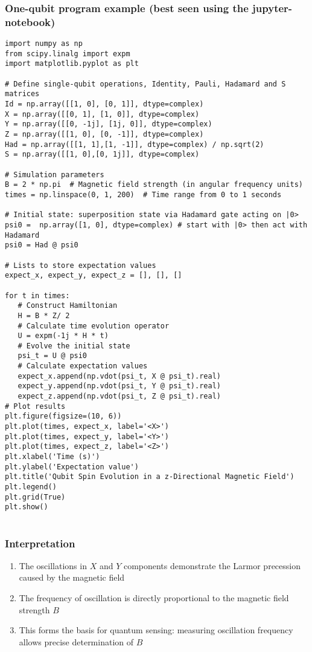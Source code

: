 \documentclass{beamer}
\begin{document}
\begin{frame}
\frametitle{One-qubit program example (best seen using the jupyter-notebook)}

\begin{verbatim}
import numpy as np
from scipy.linalg import expm
import matplotlib.pyplot as plt

# Define single-qubit operations, Identity, Pauli, Hadamard and S matrices
Id = np.array([[1, 0], [0, 1]], dtype=complex)
X = np.array([[0, 1], [1, 0]], dtype=complex)
Y = np.array([[0, -1j], [1j, 0]], dtype=complex)
Z = np.array([[1, 0], [0, -1]], dtype=complex)
Had = np.array([[1, 1],[1, -1]], dtype=complex) / np.sqrt(2)
S = np.array([[1, 0],[0, 1j]], dtype=complex)

# Simulation parameters
B = 2 * np.pi  # Magnetic field strength (in angular frequency units)
times = np.linspace(0, 1, 200)  # Time range from 0 to 1 seconds

# Initial state: superposition state via Hadamard gate acting on |0>
psi0 =  np.array([1, 0], dtype=complex) # start with |0> then act with Hadamard
psi0 = Had @ psi0

# Lists to store expectation values
expect_x, expect_y, expect_z = [], [], []

for t in times:
   # Construct Hamiltonian
   H = B * Z/ 2
   # Calculate time evolution operator
   U = expm(-1j * H * t)
   # Evolve the initial state
   psi_t = U @ psi0
   # Calculate expectation values
   expect_x.append(np.vdot(psi_t, X @ psi_t).real)
   expect_y.append(np.vdot(psi_t, Y @ psi_t).real)
   expect_z.append(np.vdot(psi_t, Z @ psi_t).real)
# Plot results
plt.figure(figsize=(10, 6))
plt.plot(times, expect_x, label='<X>')
plt.plot(times, expect_y, label='<Y>')
plt.plot(times, expect_z, label='<Z>')
plt.xlabel('Time (s)')
plt.ylabel('Expectation value')
plt.title('Qubit Spin Evolution in a z-Directional Magnetic Field')
plt.legend()
plt.grid(True)
plt.show()


\end{verbatim}
\end{frame}

\begin{frame}
\frametitle{Interpretation}

\begin{enumerate}
\item The oscillations in $X$ and $Y$ components demonstrate the Larmor precession caused by the magnetic field

\item The frequency of oscillation is directly proportional to the magnetic field strength $B$

\item This forms the basis for quantum sensing: measuring oscillation frequency allows precise determination of $B$
\end{enumerate}

\noindent
\end{frame}
\end{document}
